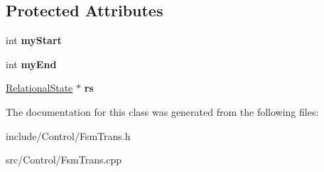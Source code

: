 \subsection*{Protected Attributes}
\begin{DoxyCompactItemize}
\item 
\hypertarget{classCartWheel_1_1FsmTrans_a5a2b4df1ef77c08c1b48cc1e1f02b0b4}{
int {\bfseries myStart}}
\label{classCartWheel_1_1FsmTrans_a5a2b4df1ef77c08c1b48cc1e1f02b0b4}

\item 
\hypertarget{classCartWheel_1_1FsmTrans_a98c63cc2392d71d397e1cb3a406fe093}{
int {\bfseries myEnd}}
\label{classCartWheel_1_1FsmTrans_a98c63cc2392d71d397e1cb3a406fe093}

\item 
\hypertarget{classCartWheel_1_1FsmTrans_a43671ce0b90d84f9a07fc7e6474a9a44}{
\hyperlink{classCartWheel_1_1RelationalState}{RelationalState} $\ast$ {\bfseries rs}}
\label{classCartWheel_1_1FsmTrans_a43671ce0b90d84f9a07fc7e6474a9a44}

\end{DoxyCompactItemize}


The documentation for this class was generated from the following files:\begin{DoxyCompactItemize}
\item 
include/Control/FsmTrans.h\item 
src/Control/FsmTrans.cpp\end{DoxyCompactItemize}
